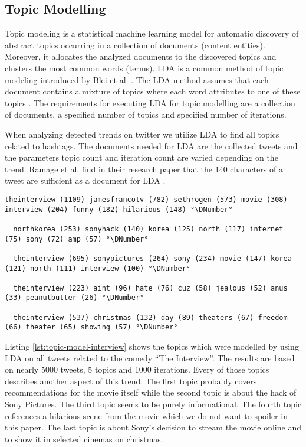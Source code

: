 \subsection{Topic Modelling}
\label{subsec:topic-modelling}
Topic modeling is a statistical machine learning model for automatic discovery of abstract topics occurring in a collection of documents (content entities). Moreover, it allocates the analyzed documents to the discovered topics and clusters the most common words (terms). LDA is a common method of topic modeling introduced by Blei et al. \cite{Blei03lda}. The LDA method assumes that each document contains a mixture of topics where each word attributes to one of these topics \cite{Blei03lda}. The requirements for executing LDA for topic modelling are a collection of documents, a specified number of topics and specified number of iterations.

When analyzing detected trends on twitter we utilize LDA to find all topics related to hashtags. The documents needed for LDA are the collected tweets and the parameters topic count and iteration count are varied depending on the trend. Ramage et al. find in their research paper that the 140 characters of a tweet are sufficient as a document for LDA \cite{ramage2010lda}.

\begin{lstlisting}[caption={[Topic Model for the Sony hack concerning the movie \enquote{The Interview}] Topic Model for the Sony hack concerning the movie \enquote{The Interview}}, label={lst:topic-model-interview}, float=h]
  theinterview (1109) jamesfrancotv (782) sethrogen (573) movie (308) interview (204) funny (182) hilarious (148) °\DNumber°

  northkorea (253) sonyhack (140) korea (125) north (117) internet (75) sony (72) amp (57) °\DNumber°

  theinterview (695) sonypictures (264) sony (234) movie (147) korea (121) north (111) interview (100) °\DNumber°

  theinterview (223) aint (96) hate (76) cuz (58) jealous (52) anus (33) peanutbutter (26) °\DNumber°

  theinterview (537) christmas (132) day (89) theaters (67) freedom (66) theater (65) showing (57) °\DNumber°
\end{lstlisting}

Listing \ref{lst:topic-model-interview} shows the topics which were modelled by using LDA on all tweets related to the comedy \enquote{The Interview}. The results are based on nearly 5000 tweets, 5 topics and 1000 iterations. Every of those topics describes another aspect of this trend. The first topic probably covers recommendations for the movie itself while the second topic is about the hack of Sony Pictures. The third topic seems to be purely informational. The fourth topic references a hilarious scene from the movie which we do not want to spoiler in this paper. The last topic is about Sony's decision to stream the movie online and to show it in selected cinemas on christmas.

